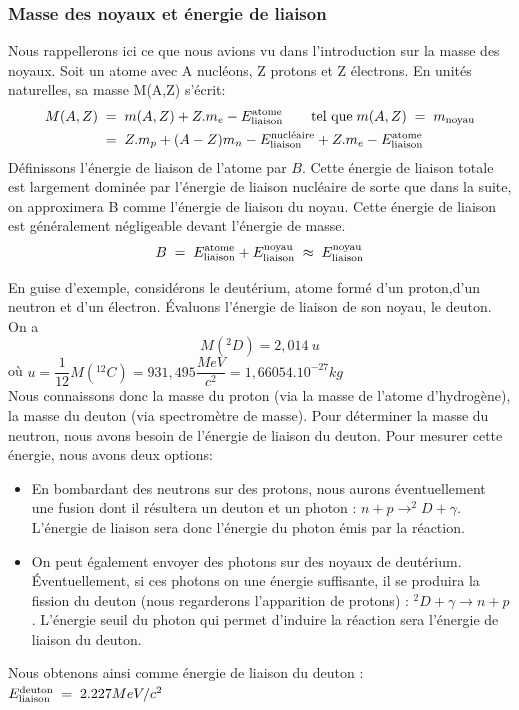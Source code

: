 \subsubsection{Masse des noyaux et énergie de liaison}


Nous rappellerons ici ce que nous avions vu dans l'introduction sur la masse des noyaux. Soit un atome avec A nucléons, Z protons et Z électrons. En unités naturelles, sa masse M(A,Z) s'écrit:
\begin{align*}
    M(A,Z) 
    &\; = \;
    m(A,Z) + Z.m_e - E^{\text{atome}}_{\text{liaison}} \qquad \text{tel que} \; m(A,Z) \; = \; m_{\text{noyau}}\\
    &\; = \;
    Z.m_p + (A-Z)m_n - E^{\text{nucléaire}}_{\text{liaison}} + Z.m_e - E^{\text{atome}}_{\text{liaison}}
\end{align*}
Définissons l'énergie de liaison de l'atome par $B$. Cette énergie de liaison totale est largement dominée par l'énergie de liaison nucléaire de sorte que dans la suite, on approximera B comme l'énergie de liaison du noyau. Cette énergie de liaison est généralement négligeable devant l'énergie de masse.
\begin{equation*}
    B \; = \;
    E^{\text{atome}}_{\text{liaison}}+E^{\text{noyau}}_{\text{liaison}}
    \;\approx\; E^{\text{noyau}}_{\text{liaison}}
\end{equation*}

En guise d'exemple, considérons le deutérium, atome formé d'un proton,d'un neutron et d'un électron. Évaluons l'énergie de liaison de son noyau, le deuton. On a 
    \begin{equation*}
        M(^{2}D)=2,014~u
    \end{equation*} 
où $u=\dfrac{1}{12}M(^{12}_{}C)=931,495\dfrac{MeV}{c^2}=1,66054.10^{-27}kg$\\[0,2cm]
Nous connaissons donc la masse du proton (via la masse de l'atome d'hydrogène), la masse du deuton (via spectromètre de masse). Pour déterminer la masse du neutron, nous avons besoin de l'énergie de liaison du deuton. Pour mesurer cette énergie, nous avons deux options:
\begin{itemize}[label=$\bullet$]
    \item En bombardant des neutrons sur des protons, nous aurons éventuellement une fusion dont il résultera un deuton et un photon : $n+p \rightarrow ^2D+\gamma$. L'énergie de liaison sera donc l'énergie du photon émis par la réaction.
    
    \item On peut également envoyer des photons sur des noyaux de deutérium. Éventuellement, si ces photons on une énergie suffisante, il se produira la fission du deuton (nous regarderons l'apparition de protons) : $^2D+\gamma \rightarrow n+p$. L'énergie seuil du photon qui permet d'induire la réaction sera l'énergie de liaison du deuton.
\end{itemize}
Nous obtenons ainsi comme énergie de liaison du deuton : $E^{\text{deuton}}_{\text{liaison}} \; = \; 2.227MeV/c^2$


